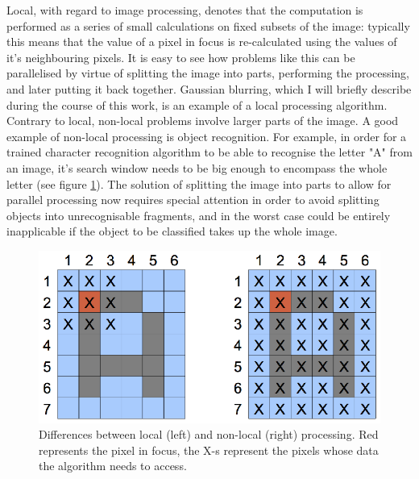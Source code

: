 \documentclass [12pt,a4paper]{report}
\begin{document}
Local, with regard to image processing, denotes that the computation is performed as a series of small calculations on fixed subsets of the image: typically this means that the value of a pixel in focus is re-calculated using the values of it's neighbouring pixels. It is easy to see how problems like this can be parallelised by virtue of splitting the image into parts, performing the processing, and later putting it back together. Gaussian blurring, which I will briefly describe during the course of this work, is an example of a local processing algorithm. Contrary to local, non-local problems involve larger parts of the image. A good example of non-local processing is object recognition. For example, in order for a trained character recognition algorithm to be able to recognise the letter "A" from an image, it's search window needs to be big enough to encompass the whole letter (see figure \ref{fig_local_nonlocal}). The solution of splitting the image into parts to allow for parallel processing now requires special attention in order to avoid splitting objects into unrecognisable fragments, and in the worst case could be entirely inapplicable if the object to be classified takes up the whole image.

\begin{figure}[h]
\begin{center}
\includegraphics[]{local_nonlocal.eps} %
\caption{Differences between local (left) and non-local (right) processing. Red represents the pixel in focus, the X-s represent the pixels whose data the algorithm needs to access.}
\label{fig_local_nonlocal}
\end{center}
\end{figure}
\end{document}
